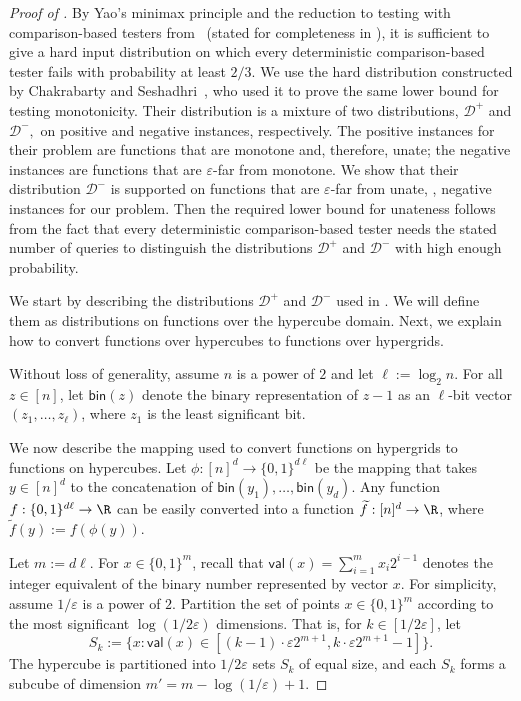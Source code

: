 \documentclass{toc}
\newcommand{\eps}{\varepsilon}
\newcommand{\Yes}{\ensuremath{\mathcal{D}^+}}
\newcommand{\No}{\ensuremath{\mathcal{D}^-}}
\newcommand{\dec}{\mathsf{val}}
\newcommand{\bin}{\mathsf{bin}}
\newcommand{\Thm}[1]{\expref{Theorem}{thm:#1}}
\begin{document}
\begin{proof}[Proof of \Thm{adap-lb}]
  By Yao's minimax principle and the reduction to testing with comparison-based testers from~\cite{Fis04,CS14} (stated for completeness in \Thm{CS14}), it is sufficient to give a hard input distribution on which every deterministic comparison-based tester fails with probability at least $2/3$. We use the hard distribution constructed  by Chakrabarty and Seshadhri~\cite{CS14}, who used it to prove the same lower bound for testing monotonicity. Their distribution is a mixture of two distributions, $\Yes$ and $\No,$ on positive and negative instances, respectively.
%
%
%
The positive %
instances for their problem are
%
%
%
%
functions that are monotone and, therefore, unate;
the %
negative instances are
%
%
functions that are $\eps$-far from monotone. We show that their 
%
%
distribution $\No$
%
is supported on functions that are $\eps$-far from unate, \ie, negative instances for our problem. Then the required lower bound for unateness follows from the fact that every deterministic comparison-based tester needs the stated number of queries to distinguish
the  %
%
%
distributions $\Yes$ and $\No$
%
with high enough probability.

We start by describing 
%
%
the distributions $\Yes$ and $\No$
%
used in \cite{CS14}. We will define them as distributions on functions over the hypercube domain. Next, we explain how to convert functions over hypercubes  to functions over hypergrids.

Without loss of generality, assume $n$ is a power of $2$ and let $\ell := \log_2 n$.
%
For all $z \in [n]$, let $\bin(z)$ denote the binary representation of $z-1$ as an $\ell$-bit vector $(z_1, \ldots, z_\ell)$, where $z_1$ is the least significant bit.

We now describe the mapping used to convert functions on hypergrids to functions on hypercubes. Let $\phi:[n]^d \to \{0,1\}^{d\ell}$ be the mapping that takes $y\in[n]^d$ to the concatenation of $\bin(y_1),\dots,\bin(y_d)$. Any function $f:\{0,1\}^{d \ell} \to \R$ can be easily converted into a function $\widetilde{f}:[n]^d \to \R$, where $\widetilde{f}(y) := f(\phi(y))$.

Let $m:= d\ell$. For $x \in \{0,1\}^m$, recall that $\dec(x) = \sum\nolimits_{i=1}^m x_i 2^{i-1}$ denotes the integer equivalent of the binary number represented by vector $x$. For simplicity, assume $1/\eps$ is a power of $2$.
Partition the set of points $x \in \{0,1\}^m$ according to the most significant $\log(1/2\eps)$ dimensions.
That is, for $k \in [1/2\eps]$, let
\[S_k := \{x: \dec(x) \in [(k-1)\cdot \eps 2^{m+1}, k\cdot\eps 2^{m+1} - 1]\}.\]
The hypercube is partitioned into $1/2\eps$ sets $S_k$ of equal size, and each $S_k$ forms a subcube of dimension $m' = m - \log(1/\eps) + 1$.


\end{proof}
\end{document}
